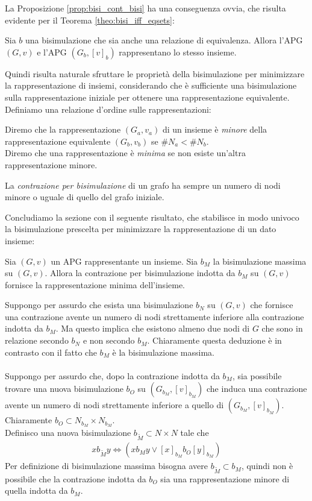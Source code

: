 La Proposizione \ref*{prop:bisi_cont_bisi} ha una conseguenza ovvia, che risulta evidente per il Teorema \ref*{theo:bisi_iff_eqsets}:
\begin{corollary}
    Sia $b$ una bisimulazione che sia anche una relazione di equivalenza. Allora l'APG $(G, v)$ e l'APG $(G_b, [v]_b)$ rappresentano lo stesso insieme.
\end{corollary}
Quindi risulta naturale sfruttare le proprietà della bisimulazione per minimizzare la rappresentazione di insiemi, considerando che è sufficiente una bisimulazione sulla rappresentazione iniziale per ottenere una rappresentazione equivalente. Definiamo una relazione d'ordine sulle rappresentazioni:
\begin{definition}
    Diremo che la rappresentazione $(G_a, v_a)$ di un insieme è \textit{minore} della rappresentazione equivalente $(G_b, v_b)$ se $\#N_a < \#N_b$.\\
    Diremo che una rappresentazione è \textit{minima} se non esiste un'altra rappresentazione minore.
\end{definition}
\begin{observation}
    La \textit{contrazione per bisimulazione} di un grafo ha sempre un numero di nodi minore o uguale di quello del grafo iniziale.
\end{observation}
Concludiamo la sezione con il seguente risultato, che stabilisce in modo univoco la bisimulazione prescelta per minimizzare la rappresentazione di un dato insieme:
\begin{theorem}
    Sia $(G,v)$ un APG rappresentante un insieme. Sia $b_M$ la bisimulazione massima su $(G,v)$. Allora la contrazione per bisimulazione indotta da $b_M$ su $(G,v)$ fornisce la rappresentazione minima dell'insieme.
\end{theorem}
\begin{proof2}
    Suppongo per assurdo che esista una bisimulazione $b_N$ su $(G,v)$ che fornisce una contrazione avente un numero di nodi strettamente inferiore alla contrazione indotta da $b_M$. Ma questo implica che esistono almeno due nodi di $G$ che sono in relazione secondo $b_N$ e non secondo $b_M$. Chiaramente questa deduzione è in contrasto con il fatto che $b_M$ è la bisimulazione massima.\\\\
    Suppongo per assurdo che, dopo la contrazione indotta da $b_M$, sia possibile trovare una nuova bisimulazione $b_O$ su $(G_{b_M}, [v]_{b_M})$ che induca una contrazione avente un numero di nodi strettamente inferiore a quello di $(G_{b_M}, [v]_{b_M})$. Chiaramente $b_O \subset N_{b_M} \times N_{b_M}$.\\
    Definisco una nuova bisimulazione $b_{\widetilde{M}} \subset N \times N$ tale che
    \begin{gather*}
        x b_{\widetilde{M}} y \iff (x b_M y \lor [x]_{b_M} b_O [y]_{b_M})
    \end{gather*}
    Per definizione di bisimulazione massima bisogna avere $b_{\widetilde{M}} \subset b_M$, quindi non è possibile che la contrazione indotta da $b_O$ sia una rappresentazione minore di quella indotta da $b_M$.
\end{proof2}

